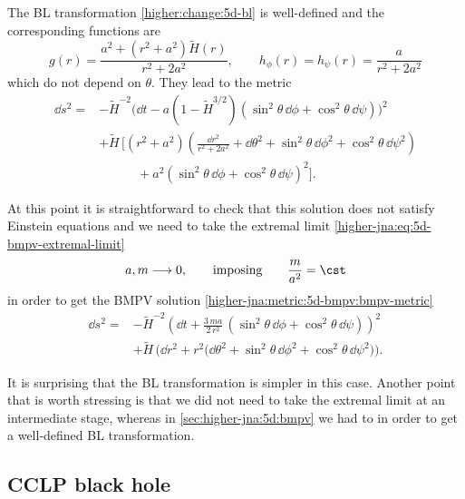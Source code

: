 The BL transformation \eqref{higher:change:5d-bl} is well-defined and the corresponding functions are
\begin{equation}
	\label{higher-jna:change:bmpv-2:bl-gh}
	g(r) = \frac{a^2 + (r^2 + a^2) \tilde H(r)}{r^2 + 2 a^2}, \qquad
	h_\phi(r) = h_\psi(r) = \frac{a}{r^2 + 2 a^2}
\end{equation} 
which do not depend on $\theta$.
They lead to the metric
\begin{equation}
	\begin{aligned}
		\dd s^2 = &- \tilde H^{-2} \big(\dd t
				- a (1 - \tilde H^{3/2}) (\sin^2 \theta\, \dd\phi + \cos^2 \theta\, \dd\psi) \big)^2 \\
			&+ \tilde H\, \bigg[
				(r^2 + a^2) \left(\frac{\dd r^2}{r^2 + 2 a^2} + \dd \theta^2 + \sin^2 \theta\, \dd\phi^2 + \cos^2 \theta\, \dd\psi^2 \right) \\
				&\qquad\quad+ a^2 (\sin^2 \theta\, \dd\phi + \cos^2 \theta\, \dd\psi)^2 \bigg].
	\end{aligned}
\end{equation} 

At this point it is straightforward to check that this solution does not satisfy Einstein equations and we need to take the extremal limit \eqref{higher-jna:eq:5d-bmpv-extremal-limit}
\begin{equation}
	a, m \longrightarrow 0, \qquad
	\text{imposing} \qquad
	\frac{m}{a^2} = \cst
\end{equation}
in order to get the BMPV solution \eqref{higher-jna:metric:5d-bmpv:bmpv-metric}
\begin{equation}
	\begin{aligned}
		\dd s^2 = &- \tilde H^{-2} \left(\dd t
				+ \frac{3\, m a}{2\, r^2}\, (\sin^2 \theta\, \dd\phi + \cos^2 \theta\, \dd\psi) \right)^2 \\
			&+ \tilde H\, \Big(\dd r^2 + r^2 \big( \dd \theta^2 + \sin^2 \theta\, \dd\phi^2 + \cos^2 \theta\, \dd\psi^2 \big) \Big).
	\end{aligned}
\end{equation} 

It is surprising that the BL transformation is simpler in this case.
Another point that is worth stressing is that we did not need to take the extremal limit at an intermediate stage, whereas in \cref{sec:higher-jna:5d:bmpv} we had to in order to get a well-defined BL transformation.


\subsection{CCLP black hole}
\label{sec:higher-jna:5d:cclp}


